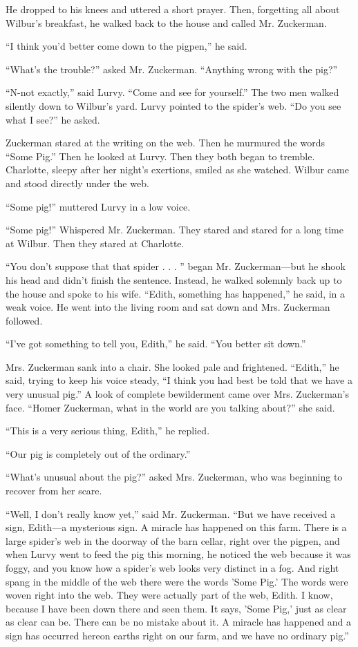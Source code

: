 \documentclass[a4paper, oneside]{book}
\begin{document}
He dropped to his knees and uttered a short prayer. Then,
forgetting all about Wilbur's breakfast, he walked back to the house
and called Mr. Zuckerman.

``I think you'd better come down to the pigpen,'' he said.

``What's the trouble?'' asked Mr. Zuckerman. ``Anything wrong
with the pig?''

``N-not exactly,'' said Lurvy. ``Come and see for yourself.''
The two men walked silently down to Wilbur's yard. Lurvy
pointed to the spider's web. ``Do you see what I see?'' he asked.

Zuckerman stared at the writing on the web. Then he
murmured the words ``Some Pig.'' Then he looked at Lurvy. Then
they both began to tremble. Charlotte, sleepy after her night's
exertions, smiled as she watched. Wilbur came and stood directly
under the web.

``Some pig!'' muttered Lurvy in a low voice.

``Some pig!'' Whispered Mr. Zuckerman. They stared and
stared for a long time at Wilbur. Then they stared at Charlotte.

``You don't suppose that that spider . . . '' began Mr.
Zuckerman---but he shook his head and didn't finish the sentence.
Instead, he walked solemnly back up to the house and spoke to his
wife. ``Edith, something has happened,'' he said, in a weak voice.
He went into the living room and sat down and Mrs. Zuckerman
followed.

``I've got something to tell you, Edith,'' he said. ``You better sit
down.''

Mrs. Zuckerman sank into a chair. She looked pale and frightened.
``Edith,'' he said, trying to keep his voice steady, ``I think you
had best be told that we have a very unusual pig.''
A look of complete bewilderment came over Mrs. Zuckerman's
face. ``Homer Zuckerman, what in the world are you talking
about?'' she said.

``This is a very serious thing, Edith,'' he replied.

``Our pig is completely out of the ordinary.''

``What's unusual about the pig?'' asked Mrs. Zuckerman, who
was beginning to recover from her scare.

``Well, I don't really know yet,'' said Mr. Zuckerman. ``But we
have received a sign, Edith---a mysterious sign. A miracle has
happened on this farm. There is a large spider's web in the
doorway of the barn cellar, right over the pigpen, and when Lurvy
went to feed the pig this morning, he noticed the web because it
was foggy, and you know how a spider's web looks very distinct in a
fog. And right spang in the middle of the web there were the words
'Some Pig.' The words were woven right into the web. They were
actually part of the web, Edith. I know, because I have been down
there and seen them. It says, 'Some Pig,' just as clear as clear can
be. There can be no mistake about it. A miracle has happened and
a sign has occurred hereon earths right on our farm, and we have
no ordinary pig.''
\end{document}
